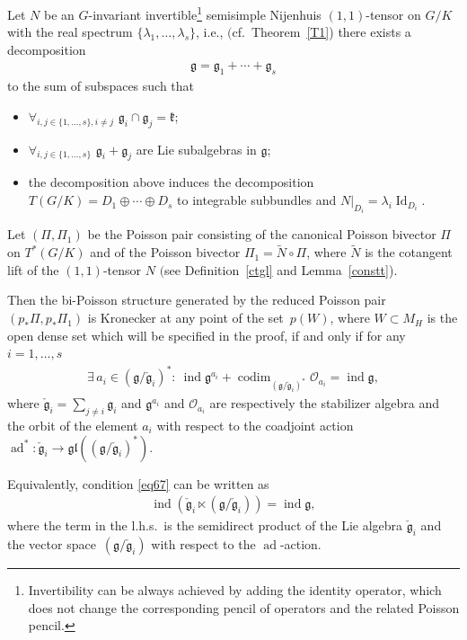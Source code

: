 \begin{Theorem}\label{kro} Let $N$ be an $G$-invariant invertible\footnote{Invertibility can be always achieved by adding the identity operator, which does not change the corresponding pencil of operators and the related Poisson pencil.} semisimple Nijenhuis $(1,1)$-tensor on $G/K$ with the real spectrum $\{\lambda_1,\dots,\lambda_s\}$, i.e., $($cf.\ Theorem~{\rm \ref{T1})} there exists a decomposition
\begin{gather}\label{dec}
\mathfrak{g} = \mathfrak{g}_1 + \cdots+ \mathfrak{g}_s
\end{gather}
to the sum of subspaces such that
\begin{itemize}\itemsep=0pt
\item $ \forall_{i,j\in \{1,\dots,s\}, i\not=j }$ $\mathfrak{g}_i\cap\mathfrak{g}_j = \mathfrak{k}$;
\item $ \forall_{i,j\in \{1,\dots,s\} }$ $\mathfrak{g}_i+\mathfrak{g}_j $ are Lie subalgebras in $\mathfrak{g}$;
\item the decomposition above induces the decomposition $T(G/K)=D_1\oplus\cdots\oplus D_s$ to integrable subbundles and $N|_{D_i}=\lambda_i\operatorname{Id}_{D_i}$.
\end{itemize}
Let $(\Pi,\Pi_1)$ be the Poisson pair consisting of the canonical Poisson bivector $\Pi$ on $T^*(G/K)$ and of the Poisson bivector $\Pi_1=\widetilde{N}\circ\Pi$, where $\widetilde{N}$ is the cotangent lift of the $(1,1)$-tensor $N$ $($see Definition~{\rm \ref{ctgl}} and Lemma~{\rm \ref{constt})}.

 Then the bi-Poisson structure generated by the reduced Poisson pair $(p_*\Pi,p_*\Pi_1)$ is Kronecker at any point of the set~$p(W)$, where $W \subset M_H$ is the open dense set which will be specified in the proof, if and only if for any $i=1,\dots,s$
 \begin{gather}\label{eq67}
\exists\, a_i\in (\mathfrak{g}/\check{\mathfrak{g}}_i)^*\colon \ \operatorname{ind} \mathfrak{g}^{a_i}+ \operatorname{codim}_{(\mathfrak{g}/\check{\mathfrak{g}}_i)^*}\mathcal{O}_{a_i} = \operatorname{ind} \mathfrak{g},
 \end{gather}
where $\check{\mathfrak{g}}_i=\sum\limits_{j\not=i}\mathfrak{g}_i$ and $\mathfrak{g}^{a_i}$ and $\mathcal{O}_{a_i}$ are respectively the stabilizer algebra and the orbit of the element $a_i$ with respect to the coadjoint action $ \operatorname{ad}^*\colon \check{\mathfrak{g}}_i \to \mathfrak{gl} (( {\mathfrak{g}}/{\check{\mathfrak{g}}_i })^*)$.

Equivalently, condition \eqref{eq67} can be written as
 \begin{gather}\label{eq78}
 \operatorname{ind} (\check{\mathfrak{g}}_i\ltimes (\mathfrak{g}/\check{\mathfrak{g}}_i))=\operatorname{ind} \mathfrak{g},
 \end{gather}
 where the term in the l.h.s.\ is the semidirect product of the Lie algebra $\check{\mathfrak{g}}_i$ and the vector space~$(\mathfrak{g}/\check{\mathfrak{g}}_i)$ with respect to the $\operatorname{ad}$-action.
 \end{Theorem}

